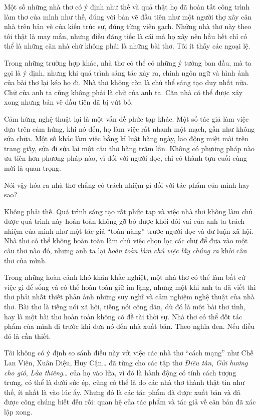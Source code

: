 \documentclass[../main.tex]{subfiles}
\begin{document}
\begin{multicols}{2}
Một số những nhà thơ có ý định như thế và quả thật họ đã hoàn tất công trình làm thơ của mình như thế, đúng với bản vẽ đầu tiên như một người thợ xây căn nhà trên bản vẽ của kiến trúc sư, đúng từng viên gạch. Những nhà thơ này theo tôi thật là may mắn, nhưng điều đáng tiếc là cái mà họ xây nên hầu hết chỉ có thể là những căn nhà chứ không phải là những bài thơ. Tôi ít thấy các ngoại lệ. 

Trong những trường hợp khác, nhà thơ có thể có những ý tưởng ban đầu, mà ta gọi là ý định, nhưng khi quá trình sáng tác xảy ra, chính ngôn ngữ và hình ảnh của bài thơ lại kéo họ đi. Nhà thơ không còn là chủ thể sáng tạo duy nhất nữa. Chữ của anh ta cũng không phải là chữ của anh ta. Căn nhà có thể được xây xong nhưng bản vẽ đầu tiên đã bị vứt bỏ. 

Cảm hứng nghệ thuật lại là một vấn đề phức tạp khác. Một số tác giả làm việc dựa trên cảm hứng, khi nó đến, họ làm việc rất nhanh một mạch, gần như không sửa chữa. Một số khác làm việc bằng kỉ luật hàng ngày, lao động miệt mài trên trang giấy, sửa đi sửa lại một câu thơ hàng trăm lần. Không có phương pháp nào ưu tiên hơn phương pháp nào, vì đối với người đọc, chỉ có thành tựu cuối cùng mới là quan trọng. 

Nói vậy hóa ra nhà thơ chẳng có trách nhiệm gì đối với tác phẩm của mình hay sao? 

Không phải thế. Quá trình sáng tạo rất phức tạp và việc nhà thơ không làm chủ được quá trình này hoàn toàn không gỡ bỏ được khỏi đôi vai của anh ta trách nhiệm của mình như một tác giả “toàn năng” trước người đọc và dư luận xã hội. Nhà thơ có thể không hoàn toàn làm chủ việc chọn lọc các chữ để đưa vào một câu thơ nào đó, nhưng anh ta lại \textit{hoàn toàn làm chủ việc lấy} \textit{chúng ra} khỏi câu thơ của mình. 

Trong những hoàn cảnh khó khăn khắc nghiệt, một nhà thơ có thể làm bất cứ việc gì để sống và có thể hoàn toàn giữ im lặng, nhưng một khi anh ta đã viết thì thơ phải nhất thiết phản ảnh những suy nghĩ và cảm nghiệm nghệ thuật của nhà thơ. Bài thơ là tiếng nói xã hội, tiếng nói công dân, dù đó là một bài thơ tình, hay là một bài thơ hoàn toàn không có đề tài thời sự. Nhà thơ có thể đốt tác phẩm của mình đi trước khi đưa nó đến nhà xuất bản. Theo nghĩa đen. Nếu điều đó là cần thiết. 

Tôi không có ý định so sánh điều này với việc các nhà thơ “cách mạng” như Chế Lan Viên, Xuân Diệu, Huy Cận… đã từng cho các tập thơ \textit{Điêu tàn}, \textit{Gửi hương cho gió}, \textit{Lửa thiêng}… của họ vào lửa, vì đó là hành động có tính cách tượng trưng, có thể là dưới sức ép, cũng có thể là do các nhà thơ thành thật tin như thế, ít nhất là vào lúc ấy. Nhưng đó là các tác phẩm đã được xuất bản và đã được công chúng biết đến rồi: quan hệ của tác phẩm và tác giả về căn bản đã xác lập xong. 


\end{multicols}
\end{document}
